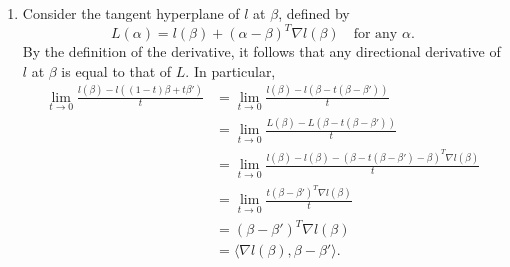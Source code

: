 \documentclass[12pt]{article}
\begin{document}
\begin{enumerate}
\begin{enumerate}[label=(\roman*)]
\item
Consider the tangent hyperplane of $l$ at $\beta$, defined by
\begin{equation*}
L(\alpha) = l(\beta) + (\alpha - \beta)^T \nabla l(\beta) \quad \text{for any $\alpha$}.
\end{equation*}
By the definition of the derivative, it follows that any directional derivative of $l$ at $\beta$ is equal to that of $L$. In particular,
\begin{align*}
\lim_{t \to 0} \frac{l(\beta) - l((1 - t)\beta + t\beta')}{t} &= \lim_{t \to 0} \frac{l(\beta) - l(\beta - t(\beta - \beta'))}{t} \\
&= \lim_{t \to 0} \frac{L(\beta) - L(\beta - t(\beta - \beta'))}{t} \\
&= \lim_{t \to 0} \frac{l(\beta) - l(\beta) - (\beta - t(\beta - \beta') - \beta)^T\nabla l(\beta)}{t} \\
&= \lim_{t \to 0} \frac{t(\beta - \beta')^T\nabla l(\beta)}{t} \\
&= (\beta - \beta')^T\nabla l(\beta) \\
&= \langle \nabla l(\beta), \beta - \beta' \rangle.
\end{align*}

\end{enumerate}


\end{enumerate}
\end{document}
